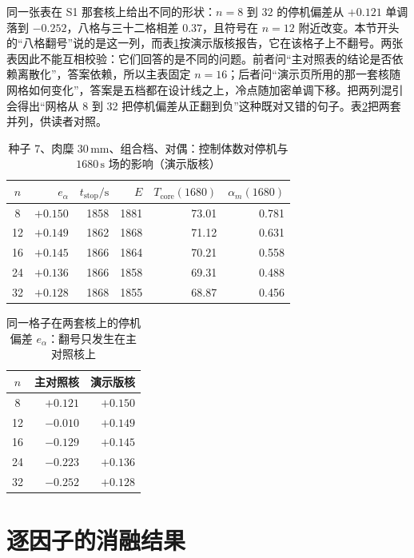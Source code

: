 同一张表在 S1 那套核上给出不同的形状：\(n=8\) 到 \(32\) 的停机偏差从 \(+0.121\) 单调落到 \(-0.252\)，八格与三十二格相差 \(0.37\)，且符号在 \(n=12\) 附近改变。本节开头的“八格翻号”说的是这一列，而表\ref{tab:gridn}{}按演示版核报告，它在该格子上不翻号。两张表因此不能互相校验：它们回答的是不同的问题。前者问“主对照表的结论是否依赖离散化”，答案依赖，所以主表固定 \(n=16\)；后者问“演示页所用的那一套核随网格如何变化”，答案是五档都在设计线之上，冷点随加密单调下移。把两列混引会得出“网格从 8 到 32 把停机偏差从正翻到负”这种既对又错的句子。表\ref{tab:gridboth}{}把两套并列，供读者对照。

\begin{table}[t]
\centering
\caption{种子 7、肉糜 \(30\,\mathrm{mm}\)、组合档、对偶：控制体数对停机与 \(1680\,\mathrm{s}\) 场的影响（演示版核）}
\label{tab:gridn}
\setlength{\tabcolsep}{3.8pt}
{\small
\begin{tabular}{crrrrr}
\toprule
\(n\) & \(e_{\alpha}\) & \(t_{\mathrm{stop}}/\mathrm{s}\) & \(E\) & \(T_{\mathrm{core}}(1680)\) & \(\alpha_m(1680)\) \\
\midrule
8 & \(+0.150\) & 1858 & 1881 & 73.01 & 0.781 \\
12 & \(+0.149\) & 1862 & 1868 & 71.12 & 0.631 \\
16 & \(+0.145\) & 1866 & 1864 & 70.21 & 0.558 \\
24 & \(+0.136\) & 1866 & 1858 & 69.31 & 0.488 \\
32 & \(+0.128\) & 1868 & 1855 & 68.87 & 0.456 \\
\bottomrule
\end{tabular}}
\end{table}

\begin{table}[htbp]
\centering
\caption{同一格子在两套核上的停机偏差 \(e_{\alpha}\)：翻号只发生在主对照核上}
\label{tab:gridboth}
\setlength{\tabcolsep}{2.6pt}
{\footnotesize
\begin{tabular}{crr}
\toprule
\(n\) & 主对照核 & 演示版核 \\
\midrule
8 & \(+0.121\) & \(+0.150\) \\
12 & \(-0.010\) & \(+0.149\) \\
16 & \(-0.129\) & \(+0.145\) \\
24 & \(-0.223\) & \(+0.136\) \\
32 & \(-0.252\) & \(+0.128\) \\
\bottomrule
\end{tabular}}
\end{table}

\section{逐因子的消融结果}
\label{ch:ablate}

